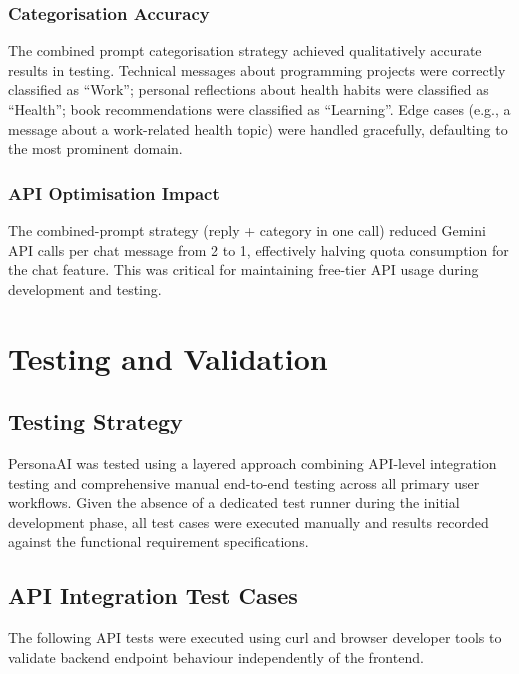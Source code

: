 \documentclass[12pt,a4paper]{report}
\begin{document}
\subsection{Categorisation Accuracy}
The combined prompt categorisation strategy achieved qualitatively accurate results in testing. Technical messages about programming projects were correctly classified as ``Work''; personal reflections about health habits were classified as ``Health''; book recommendations were classified as ``Learning''. Edge cases (e.g., a message about a work-related health topic) were handled gracefully, defaulting to the most prominent domain.

\subsection{API Optimisation Impact}
The combined-prompt strategy (reply + category in one call) reduced Gemini API calls per chat message from 2 to 1, effectively halving quota consumption for the chat feature. This was critical for maintaining free-tier API usage during development and testing.

\chapter{Testing and Validation}

\section{Testing Strategy}

PersonaAI was tested using a layered approach combining API-level integration testing and comprehensive manual end-to-end testing across all primary user workflows. Given the absence of a dedicated test runner during the initial development phase, all test cases were executed manually and results recorded against the functional requirement specifications.

\section{API Integration Test Cases}

The following API tests were executed using curl and browser developer tools to validate backend endpoint behaviour independently of the frontend.
\end{document}
